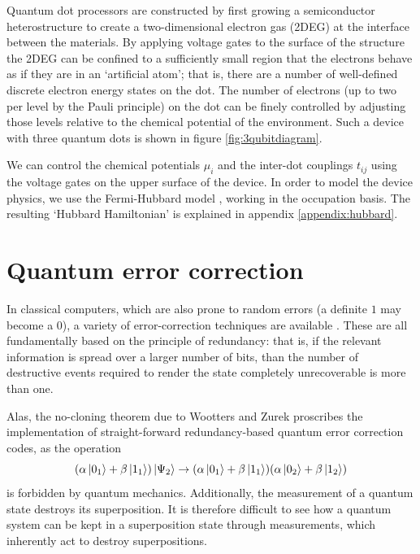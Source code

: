 \documentclass{report}
\begin{document}
Quantum dot processors are constructed by first growing a semiconductor heterostructure to create a two-dimensional electron gas (2DEG) at the interface between the materials. By applying voltage gates to the surface of the structure the 2DEG can be confined to a sufficiently small region that the electrons behave as if they are in an `artificial atom'; that is, there are a number of well-defined discrete electron energy states on the dot. The number of electrons (up to two per level by the Pauli principle) on the dot can be finely controlled by adjusting those levels relative to the chemical potential of the environment. Such a device with three quantum dots is shown in figure \ref{fig:3qubitdiagram}.

We can control the chemical potentials $\mu_i$ and the inter-dot couplings $t_{ij}$ using the voltage gates on the upper surface of the device. In order to model the device physics, we use the Fermi-Hubbard model \cite{Hubbard1963}, working in the occupation basis. The resulting `Hubbard Hamiltonian' is explained in appendix \ref{appendix:hubbard}.

\section{Quantum error correction}
In classical computers, which are also prone to random errors (a definite $1$ may become a $0$), a variety of error-correction techniques are available \cite{moon_2005}. These are all fundamentally based on the principle of redundancy: that is, if the relevant information is spread over a larger number of bits, than the number of destructive events required to render the state completely unrecoverable is more than one. 

Alas, the no-cloning theorem due to Wootters and Zurek\cite{wootters_1982} proscribes the implementation of straight-forward redundancy-based quantum error correction codes, as the operation
\begin{equation*}
    (\alpha\ket{0_1} + \beta\ket{1_1})\ket{\Psi_2} \rightarrow (\alpha\ket{0_1} + \beta\ket{1_1})(\alpha\ket{0_2} + \beta\ket{1_2})
\end{equation*} is forbidden by quantum mechanics. Additionally, the measurement of a quantum state destroys its superposition. It is therefore difficult to see how a quantum system can be kept in a superposition state through measurements, which inherently act to destroy superpositions.
\end{document}
